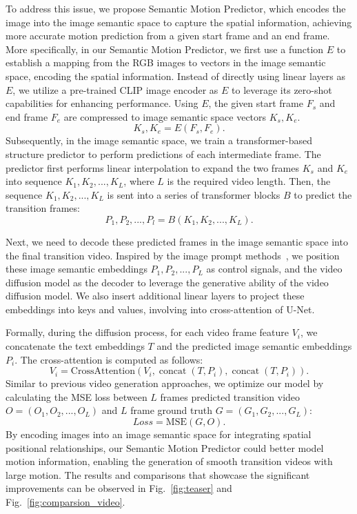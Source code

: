 \documentclass{article} %
\newcommand{\nameofmm}{Semantic Motion Predictor}
\renewcommand{\figref}[1]{Fig.~\ref{#1}}
\begin{document}
To address this issue, we propose \nameofmm{}, which encodes the image into the image semantic space to capture the spatial information, achieving more accurate motion prediction from a given start frame and an end frame.
More specifically, in our \nameofmm{}, we first use a function $E$ to establish a mapping from the RGB images to vectors in the image semantic space, encoding the spatial information.
Instead of directly using linear layers as $E$, we utilize a pre-trained CLIP image encoder as $E$ to leverage its zero-shot capabilities for enhancing performance. Using $E$, the given start frame $F_s$ and end frame $F_e$ are compressed to image semantic space vectors  $K_s, K_e$.
\begin{equation}
    K_s,K_e = E\left ( F_s, F_e  \right ).
\end{equation}
%
Subsequently, in the image semantic space, we train a transformer-based structure predictor to perform predictions of each intermediate frame.
The predictor first performs linear interpolation to expand the two frames $K_s$ and $K_e$ into sequence $K_1, K_2,..., K_L$, where $L$ is the required video length.
%
Then, the sequence $K_1, K_2,..., K_L$ is sent into a series of transformer blocks $B$ to predict the transition frames:
\begin{equation}
    P_1,P_2,...,P_l = B\left ( K_1, K_2,..., K_L  \right ).
\end{equation}

Next, we need to decode these predicted frames in the image semantic space into the final transition video.
%
Inspired by the image prompt methods~\citep{ye2023ip}, we position these image semantic embeddings $P_1, P_2, ..., P_L$  as control signals, and the video diffusion model as the decoder to leverage the generative ability of the video diffusion model. 
%
We also insert additional linear layers to project these embeddings into keys and values, involving into cross-attention of U-Net.

Formally, during the diffusion process, for each video frame feature $V_i$, we concatenate the text embeddings $T$ and the predicted image semantic embeddings $P_i$.
%
The cross-attention is computed as follows:
\begin{equation}
    V_i = \mathrm{CrossAttention}\left( V_i, \operatorname{concat}(T,P_i),\operatorname{concat}(T,P_i) \right ).
\end{equation}
Similar to previous video generation approaches, we optimize our model by calculating the MSE loss between $L$ frames predicted transition video $O=(O_1, O_2,..., O_L)$ and $L$ frame ground truth $G = (G_1, G_2,..., G_L)$:
\begin{equation}
    Loss = \mathrm{MSE}\left( G,O  \right ).
\end{equation}
By encoding images into an image semantic space for integrating spatial positional relationships,  our \nameofmm{} could better model motion information, enabling the generation of smooth transition videos with large motion.
%
The results and comparisons that showcase the significant improvements can be observed in \figref{fig:teaser} and \figref{fig:comparsion_video}. 
\end{document}
